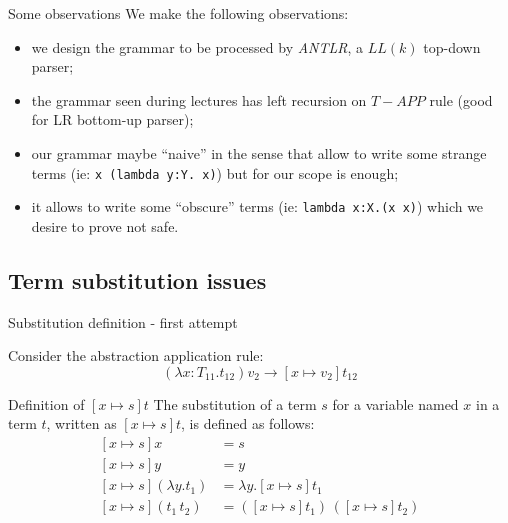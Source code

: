 \documentclass[8pt]{beamer}
\begin{document}
\begin{frame}{Some observations}
    We make the following observations:
      \begin{itemize}
        \item we design the grammar to be processed by \emph{ANTLR}, a $LL(k)$
            top-down parser;
        \item the grammar seen during lectures has left recursion on 
            $T-APP$ rule (good for LR bottom-up parser);
        \item our grammar maybe ``naive'' in the sense that allow to write 
            some strange terms (ie: \texttt{x (lambda y:Y. x)}) but for our 
            scope is enough;
        \item it allows to write some ``obscure'' terms (ie: 
            \texttt{lambda x:X.(x x)}) which we desire to prove not safe.
    \end{itemize}
\end{frame}

\subsection{Term substitution issues}

\begin{frame}{Substitution definition - first attempt}

    Consider the abstraction application rule:
    \begin{displaymath}
        (\lambda x:T_{11}.t_{12})v_{2} \rightarrow [x \mapsto v_{2}]t_{12}
    \end{displaymath}

    \begin{block}{Definition of $[x \mapsto s]t$}
        The substitution of a term $s$ for a variable named $x$ in a term $t$,
        written as $[x \mapsto s]t$, is defined as follows:
        \begin{displaymath}
            \begin{split}
                [x \mapsto s]x &= s \\
                [x \mapsto s]y &= y \\
                [x \mapsto s](\lambda y.t_{1}) &= \lambda y. [x \mapsto s]t_{1} \\
                [x \mapsto s](t_{1} \, t_{2}) &= 
                    ([x \mapsto s]t_{1})\, ([x \mapsto s]t_{2})\\
            \end{split}
        \end{displaymath}        
    \end{block}

\end{frame}
\end{document}
